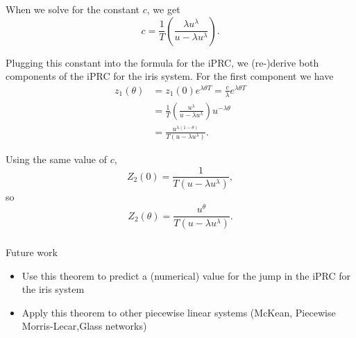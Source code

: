 \documentclass{beamer}
\begin{document}
\begin{frame}
When we solve for the constant $c$, we get
\begin{equation}
 c  = \frac{1}{T}\left (\frac{\lambda u^\lambda}{u - \lambda u^\lambda}\right ).
\end{equation}

Plugging this constant into the formula for the iPRC, we (re-)derive both components of the iPRC for the iris system.  For the first component we have
\begin{equation}
\begin{split}
 z_1(\theta) &= z_1(0)e^{\lambda \theta T} = \frac{c}{\lambda}e^{\lambda \theta T} \\
 &=\frac{1}{T}  \left (\frac{u^\lambda}{u- \lambda u^\lambda}\right ) u^{-\lambda \theta}\\
 &=\frac{u^{\lambda(1-\theta)}}{T(u- \lambda u^\lambda)}.
\end{split}
\end{equation}
\end{frame}

\begin{frame}
Using the same value of $c$, 
\begin{equation}
  Z_2(0) = \frac{1}{T (u-\lambda u^\lambda)},
\end{equation}
so
\begin{equation}
 Z_2(\theta) =\frac{u^{\theta}}{T (u-\lambda u^\lambda)}.
\end{equation}
\end{frame}

\begin{frame}
\frametitle{\insertsection}
Future work
\begin{itemize}
 \item Use this theorem to predict a (numerical) value for the jump in the iPRC for the iris system
 \item Apply this theorem to other piecewise linear systems (McKean, Piecewise Morris-Lecar,Glass networks)
\end{itemize}
\end{frame}



\end{document}
